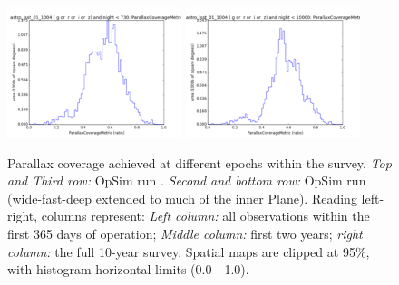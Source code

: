 \begin{figure}[ht]
\begin{center}
  \includegraphics[width=2.0in]{./figs/milkyway/astromPanels/MW_Astrom_paCovge_wfdPlane_02y_hst.png}
  \includegraphics[width=2.0in]{./figs/milkyway/astromPanels/MW_Astrom_paCovge_wfdPlane_10y_hst.png}
  \end{center}
  \caption{Parallax coverage achieved at different epochs within the survey. {\it Top and Third row:} OpSim run . {\it Second and bottom row:} OpSim run  (wide-fast-deep extended to much of the inner Plane). Reading left-right, columns represent: {\it Left column:} all observations within the first 365 days of operation; {\it Middle column:} first two years; {\it right column:} the full 10-year survey. Spatial maps are clipped at 95\%, with histogram horizontal limits (0.0 - 1.0).}
  \label{fig_astrom_ByTime_PACoverage}
\end{figure}

